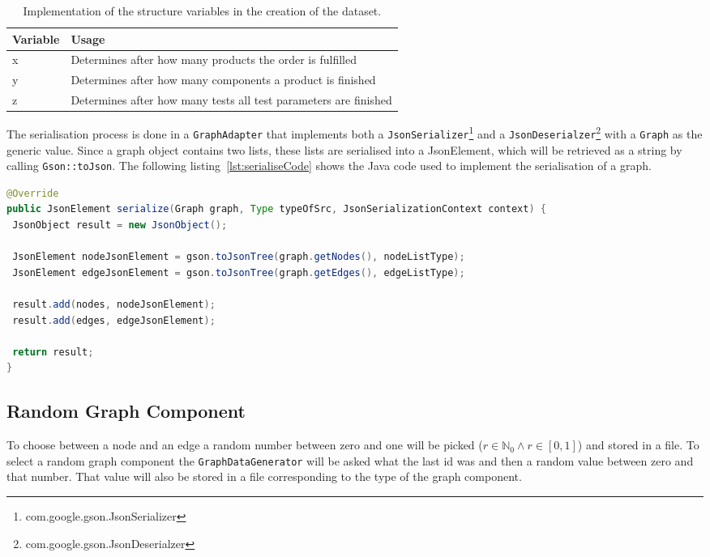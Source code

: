 \begin{table}[h!]
  \begin{tabularx}{\textwidth}{ | l | X | }
    \hline
    Variable & Usage \\ \hline \hline
    x & Determines after how many products the order is fulfilled \\ \hline
    y & Determines after how many components a product is finished \\ \hline
    z & Determines after how many tests all test parameters are finished \\ \hline
  \end{tabularx}
  \caption{Implementation of the structure variables in the creation of the dataset.}
  \label{tab:recorderVariables}
\end{table}

The serialisation process is done in a \texttt{GraphAdapter} that implements both a \texttt{JsonSerializer}\footnote{com.google.gson.JsonSerializer} and a \texttt{JsonDeserialzer}\footnote{com.google.gson.JsonDeserialzer} with a \texttt{Graph} as the generic value.
Since a graph object contains two lists,
these lists are serialised into a JsonElement,
which will be retrieved as a string by calling \texttt{Gson::toJson}.
The following listing~\ref{lst:serialiseCode} shows the Java code used to implement the serialisation of a graph.

\begin{lstlisting}[language=Java,label={lst:serialiseCode},caption={Serialisation of a graph object.},captionpos=b]
@Override
public JsonElement serialize(Graph graph, Type typeOfSrc, JsonSerializationContext context) {
 JsonObject result = new JsonObject();

 JsonElement nodeJsonElement = gson.toJsonTree(graph.getNodes(), nodeListType);
 JsonElement edgeJsonElement = gson.toJsonTree(graph.getEdges(), edgeListType);

 result.add(nodes, nodeJsonElement);
 result.add(edges, edgeJsonElement);

 return result;
}
\end{lstlisting}

\subsection{Random Graph Component}
To choose between a node and an edge a random number between zero and one will be picked ($ r \in \mathbb{N}_0 \wedge r \in [ 0, 1 ] $) and stored in a file.
To select a random graph component the \texttt{GraphDataGenerator} will be asked what the last id was and then a random value between zero and that number.
That value will also be stored in a file corresponding to the type of the graph component.

